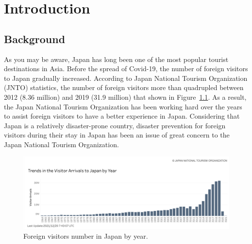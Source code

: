 \chapter{Introduction}

\section{Background}
As you may be aware, Japan has long been one of the most popular tourist destinations in Asia. Before the spread of Covid-19, the number of foreign visitors to Japan gradually increased. According to Japan National Tourism Organization (JNTO) statistics, the number of foreign visitors more than quadrupled between 2012 (8.36 million) and 2019 (31.9 million) that shown in Figure~\ref{fig1}. As a result, the Japan National Tourism Organization has been working hard over the years to assist foreign visitors to have a better experience in Japan. Considering that Japan is a relatively disaster-prone country, disaster prevention for foreign visitors during their stay in Japan has been an issue of great concern to the Japan National Tourism Organization.

\begin{figure}[h]
  \includegraphics[width=\linewidth]{Figure/Figure.png}
  \centering
  \caption[Foreign visitors number in Japan by year.]{Foreign visitors number in Japan by year.\protect\footnotemark }
  \label{fig1}
\end{figure}

